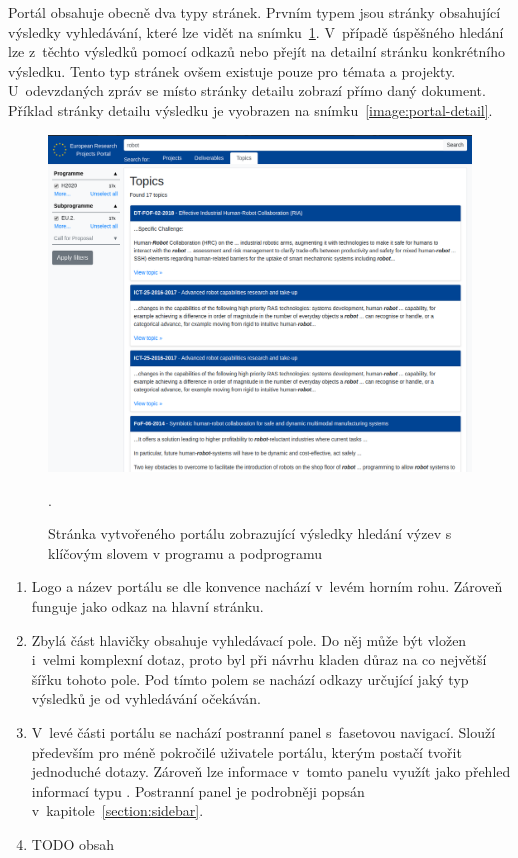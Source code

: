 Portál obsahuje obecně dva typy stránek. Prvním typem jsou stránky obsahující výsledky vyhledávání, které lze vidět na snímku~\ref{image:portal-results}. V~případě úspěšného hledání lze z~těchto výsledků pomocí odkazů  nebo  přejít na detailní stránku konkrétního výsledku. Tento typ stránek ovšem existuje pouze pro témata a projekty. U~odevzdaných zpráv se místo stránky detailu zobrazí přímo daný dokument. Příklad stránky detailu výsledku je vyobrazen na snímku~\ref{image:portal-detail}.

\begin{figure}[H]
	\centering
	\includegraphics[width=\textwidth]{obrazky-figures/my-results.png}
	\caption{Stránka vytvořeného portálu zobrazující výsledky hledání výzev s klíčovým slovem  v programu  a podprogramu }.
	\label{image:portal-results}
\end{figure}
\begin{enumerate}
    \item Logo a název portálu se dle konvence nachází v~levém horním rohu. Zároveň funguje jako odkaz na hlavní stránku.
    \item Zbylá část hlavičky obsahuje vyhledávací pole. Do něj může být vložen i~velmi komplexní dotaz, proto byl při návrhu kladen důraz na co největší šířku tohoto pole. Pod tímto polem se nachází odkazy určující jaký typ výsledků je od vyhledávání očekáván.
    \item V~levé části portálu se nachází postranní panel s~fasetovou navigací. Slouží především pro méně pokročilé uživatele portálu, kterým postačí tvořit jednoduché dotazy. Zároveň lze informace v~tomto panelu využít jako přehled informací typu . Postranní panel je podrobněji popsán v~kapitole~\ref{section:sidebar}.
    \item TODO obsah
\end{enumerate}



